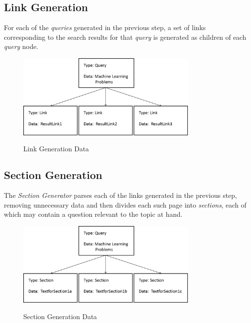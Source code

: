 \documentclass[a4paper,10pt]{report}
\begin{document}
\subsection{Link Generation}

For each of the \emph{queries} generated in the previous step, a set of links corresponding to the search results for that \emph{query} is generated as children of each \emph{query} node. 

\begin{figure}[h!]
\centering
\includegraphics[width=0.80\textwidth]{./diagrams/tree2}\\
\caption{Link Generation Data}
\end{figure}

\clearpage

\subsection{Section Generation}

The \emph{Section Generator} parses each of the links generated in the previous step, removing unnecessary data and then divides each such page into \emph{sections}, each of which may contain a question relevant to the topic at hand. 

\begin{figure}[h!]
\centering
\includegraphics[width=0.80\textwidth]{./diagrams/tree3}\\
\caption{Section Generation Data}
\end{figure}
\end{document}
